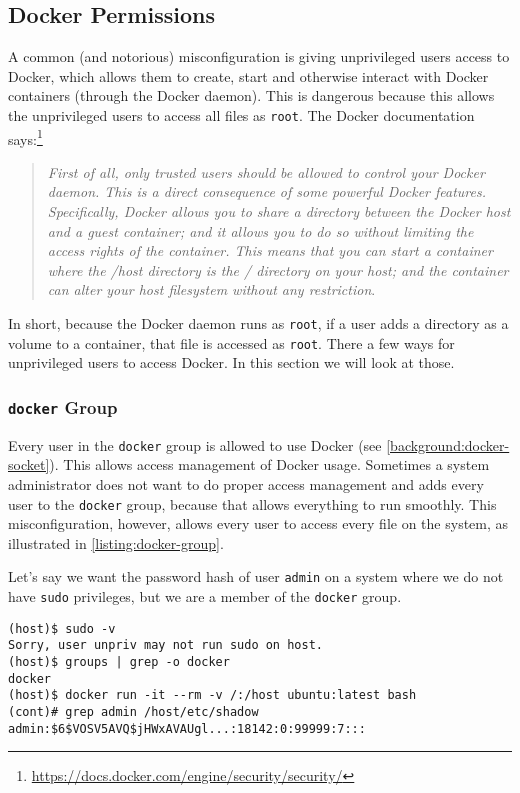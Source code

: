 \subsection{Docker Permissions}\label{subsection:docker-permissions}
A common (and notorious) misconfiguration is giving unprivileged users access to Docker, which allows them to create, start and otherwise interact with Docker containers (through the Docker daemon). This is dangerous because this allows the unprivileged users to access all files as \lstinline{root}. The Docker documentation says:\footnote{\url{https://docs.docker.com/engine/security/security/}}
\begin{quote}
\emph{First of all, only trusted users should be allowed to control your Docker daemon. This is a direct consequence of some powerful Docker features. Specifically, Docker allows you to share a directory between the Docker host and a guest container; and it allows you to do so without limiting the access rights of the container. This means that you can start a container where the /host directory is the / directory on your host; and the container can alter your host filesystem without any restriction}.
\end{quote}

In short, because the Docker daemon runs as \lstinline{root}, if a user adds a directory as a volume to a container, that file is accessed as \lstinline{root}. There a few ways for unprivileged users to access Docker. In this section we will look at those.

\subsubsection{\texorpdfstring{\lstinline{docker}}{docker} Group}
Every user in the \lstinline{docker} group is allowed to use Docker (see \autoref{background:docker-socket}). This allows access management of Docker usage. Sometimes a system administrator does not want to do proper access management and adds every user to the \lstinline{docker} group, because that allows everything to run smoothly. This misconfiguration, however, allows every user to access every file on the system, as illustrated in \autoref{listing:docker-group}.

\medskip

Let's say we want the password hash of user \lstinline{admin} on a system where we do not have \lstinline{sudo} privileges, but we are a member of the \lstinline{docker} group.

\begin{lstlisting}[caption={Docker \lstinline{group} exploit example.},captionpos=b,label={listing:docker-group}]
(host)$ sudo -v
Sorry, user unpriv may not run sudo on host.
(host)$ groups | grep -o docker
docker
(host)$ docker run -it --rm -v /:/host ubuntu:latest bash
(cont)# grep admin /host/etc/shadow
admin:$6$VOSV5AVQ$jHWxAVAUgl...:18142:0:99999:7:::
\end{lstlisting}

